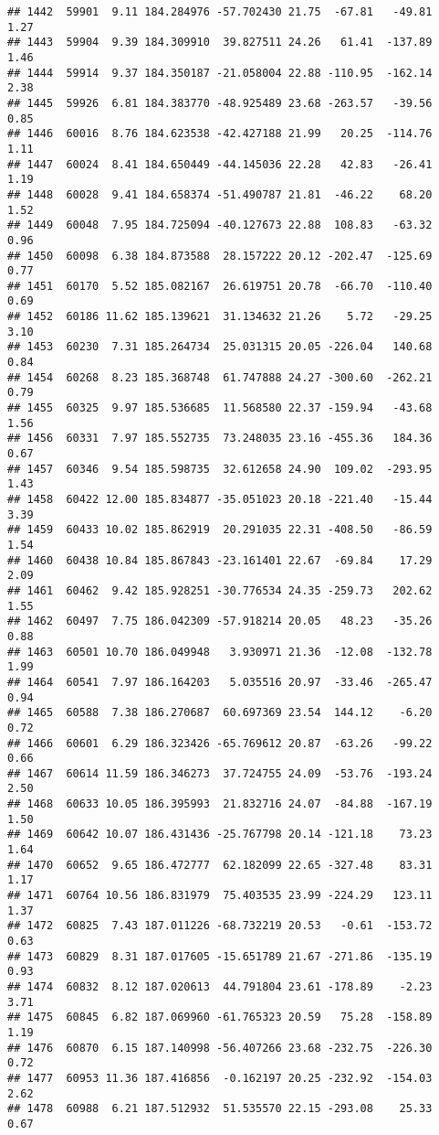 \documentclass[]{article}
\begin{document}
\begin{verbatim}
## 1442  59901  9.11 184.284976 -57.702430 21.75  -67.81   -49.81  1.27
## 1443  59904  9.39 184.309910  39.827511 24.26   61.41  -137.89  1.46
## 1444  59914  9.37 184.350187 -21.058004 22.88 -110.95  -162.14  2.38
## 1445  59926  6.81 184.383770 -48.925489 23.68 -263.57   -39.56  0.85
## 1446  60016  8.76 184.623538 -42.427188 21.99   20.25  -114.76  1.11
## 1447  60024  8.41 184.650449 -44.145036 22.28   42.83   -26.41  1.19
## 1448  60028  9.41 184.658374 -51.490787 21.81  -46.22    68.20  1.52
## 1449  60048  7.95 184.725094 -40.127673 22.88  108.83   -63.32  0.96
## 1450  60098  6.38 184.873588  28.157222 20.12 -202.47  -125.69  0.77
## 1451  60170  5.52 185.082167  26.619751 20.78  -66.70  -110.40  0.69
## 1452  60186 11.62 185.139621  31.134632 21.26    5.72   -29.25  3.10
## 1453  60230  7.31 185.264734  25.031315 20.05 -226.04   140.68  0.84
## 1454  60268  8.23 185.368748  61.747888 24.27 -300.60  -262.21  0.79
## 1455  60325  9.97 185.536685  11.568580 22.37 -159.94   -43.68  1.56
## 1456  60331  7.97 185.552735  73.248035 23.16 -455.36   184.36  0.67
## 1457  60346  9.54 185.598735  32.612658 24.90  109.02  -293.95  1.43
## 1458  60422 12.00 185.834877 -35.051023 20.18 -221.40   -15.44  3.39
## 1459  60433 10.02 185.862919  20.291035 22.31 -408.50   -86.59  1.54
## 1460  60438 10.84 185.867843 -23.161401 22.67  -69.84    17.29  2.09
## 1461  60462  9.42 185.928251 -30.776534 24.35 -259.73   202.62  1.55
## 1462  60497  7.75 186.042309 -57.918214 20.05   48.23   -35.26  0.88
## 1463  60501 10.70 186.049948   3.930971 21.36  -12.08  -132.78  1.99
## 1464  60541  7.97 186.164203   5.035516 20.97  -33.46  -265.47  0.94
## 1465  60588  7.38 186.270687  60.697369 23.54  144.12    -6.20  0.72
## 1466  60601  6.29 186.323426 -65.769612 20.87  -63.26   -99.22  0.66
## 1467  60614 11.59 186.346273  37.724755 24.09  -53.76  -193.24  2.50
## 1468  60633 10.05 186.395993  21.832716 24.07  -84.88  -167.19  1.50
## 1469  60642 10.07 186.431436 -25.767798 20.14 -121.18    73.23  1.64
## 1470  60652  9.65 186.472777  62.182099 22.65 -327.48    83.31  1.17
## 1471  60764 10.56 186.831979  75.403535 23.99 -224.29   123.11  1.37
## 1472  60825  7.43 187.011226 -68.732219 20.53   -0.61  -153.72  0.63
## 1473  60829  8.31 187.017605 -15.651789 21.67 -271.86  -135.19  0.93
## 1474  60832  8.12 187.020613  44.791804 23.61 -178.89    -2.23  3.71
## 1475  60845  6.82 187.069960 -61.765323 20.59   75.28  -158.89  1.19
## 1476  60870  6.15 187.140998 -56.407266 23.68 -232.75  -226.30  0.72
## 1477  60953 11.36 187.416856  -0.162197 20.25 -232.92  -154.03  2.62
## 1478  60988  6.21 187.512932  51.535570 22.15 -293.08    25.33  0.67

\end{verbatim}
\end{document}
